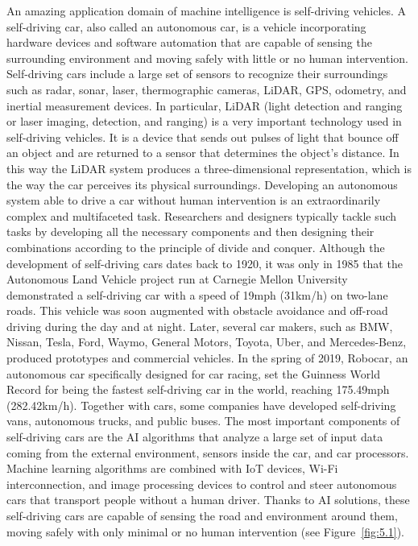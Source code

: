 An amazing application domain of machine intelligence is self-driving vehicles. A self-driving car, also called an autonomous car, is a vehicle incorporating hardware devices and software automation that are capable of sensing the surrounding environment and moving safely with little or no human intervention. Self-driving cars include a large set of sensors to recognize their surroundings such as radar, sonar, laser, thermographic cameras, LiDAR, GPS, odometry, and inertial measurement devices. In particular, LiDAR (light detection and ranging or laser imaging, detection, and ranging) is a very important technology used in self-driving vehicles. It is a device that sends out pulses of light that bounce off an object and are returned to a sensor that determines the object's distance. In this way the LiDAR system produces a three-dimensional representation, which is the way the car perceives its physical surroundings. Developing an autonomous system able to drive a car without human intervention is an extraordinarily complex and multifaceted task. Researchers and designers typically tackle such tasks by developing all the necessary components and then designing their combinations according to the principle of divide and conquer. Although the development of self-driving cars dates back to 1920, it was only in 1985 that the Autonomous Land Vehicle project run at Carnegie Mellon University demonstrated a self-driving car with a speed of 19mph (31km/h) on two-lane roads. This vehicle was soon augmented with obstacle avoidance and off-road driving during the day and at night. Later, several car makers, such as BMW, Nissan, Tesla, Ford, Waymo, General Motors, Toyota, Uber, and Mercedes-Benz, produced prototypes and commercial vehicles. In the spring of 2019, Robocar, an autonomous car specifically designed for car racing, set the Guinness World Record for being the fastest self-driving car in the world, reaching 175.49mph (282.42km/h). Together with cars, some companies have developed self-driving vans, autonomous trucks, and public buses. The most important components of self-driving cars are the AI algorithms that analyze a large set of input data coming from the external environment, sensors inside the car, and car processors. Machine learning algorithms are combined with IoT devices, Wi-Fi interconnection, and image processing devices to control and steer autonomous cars that transport people without a human driver. Thanks to AI solutions, these self-driving cars are capable of sensing the road and environment around them, moving safely with only minimal or no human intervention (see Figure~\ref{fig:5.1}).


